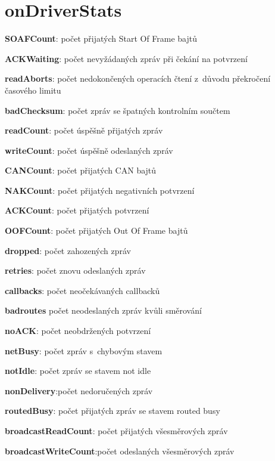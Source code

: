 \documentclass[thesis=M,czech]{FITthesis}[2012/06/26]
\begin{document}
\section{onDriverStats}
\begin{description}
 \item \textbf{SOAFCount}: počet přijatých Start Of Frame bajtů
 \item \textbf{ACKWaiting}: počet nevyžádaných zpráv při čekání na potvrzení
 \item \textbf{readAborts}: počet nedokončených operacích čtení z~důvodu překročení časového limitu
 \item \textbf{badChecksum}: počet zpráv se špatných kontrolním součtem
 \item \textbf{readCount}: počet úspěšně přijatých zpráv
 \item \textbf{writeCount}: počet úspěšně odeslaných zpráv
 \item \textbf{CANCount}: počet přijatých CAN bajtů
 \item \textbf{NAKCount}: počet přijatých negativních potvrzení
 \item \textbf{ACKCount}: počet přijatých potvrzení
 \item \textbf{OOFCount}: počet přijatých Out Of Frame bajtů
 \item \textbf{dropped}: počet zahozených zpráv 
 \item \textbf{retries}: počet znovu odeslaných zpráv
 \item \textbf{callbacks}: počet neočekávaných callbacků
 \item \textbf{badroutes} počet neodeslaných zpráv kvůli směrování
 \item \textbf{noACK}: počet neobdržených potvrzení
 \item \textbf{netBusy}: počet zpráv s~chybovým stavem
 \item \textbf{notIdle}: počet zpráv se stavem not idle
 \item \textbf{nonDelivery}:počet nedoručených zpráv
 \item \textbf{routedBusy}:  počet přijatých zpráv se stavem routed busy
 \item \textbf{broadcastReadCount}: počet přijatých všesměrových zpráv
 \item \textbf{broadcastWriteCount}:počet odeslaných všesměrových zpráv
\end{description}
\end{document}
